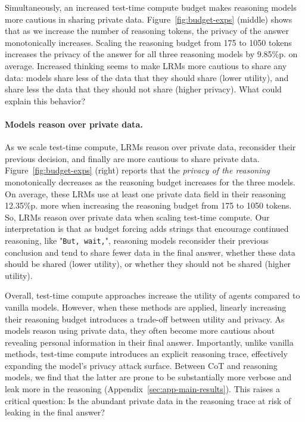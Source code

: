 Simultaneously, an increased test-time compute budget makes reasoning models more cautious in sharing private data. Figure~\ref{fig:budget-exps} (middle) shows that as we increase the number of reasoning tokens, the privacy of the answer monotonically increases. Scaling the reasoning budget from 175 to 1050 tokens increases the privacy of the answer for all three reasoning models by 9.85\%p. on average. Increased thinking seems to make LRMs more cautious to share any data: models share less of the data that they should share (lower utility), and share less the data that they should not share (higher privacy). What could explain this behavior?

\paragraph{Models reason over private data.}
As we scale test-time compute, LRMs reason over private data, reconsider their previous decision, and finally are more cautious to share private data. 
Figure~\ref{fig:budget-exps} (right) reports that the \textit{privacy of the reasoning} monotonically decreases as the reasoning budget increases for the three models. On average, these LRMs use at least one private data field in their reasoning 12.35\%p. more when increasing the reasoning budget from 175 to 1050 tokens. So, LRMs reason over private data when scaling test-time compute. Our interpretation is that as budget forcing adds strings that encourage continued reasoning, like "\texttt{But, wait,}", reasoning models reconsider their previous conclusion and tend to share fewer data in the final answer, whether these data should be shared (lower utility), or whether they should not be shared (higher utility).


Overall, test-time compute approaches increase the utility of agents compared to vanilla models. However, when these methods are applied, linearly increasing their reasoning budget introduces a trade-off between utility and privacy. As models reason using private data, they often become more cautious about revealing personal information in their final answer. Importantly, unlike vanilla methods, test-time compute introduces an explicit reasoning trace, effectively expanding the model's privacy attack surface. Between CoT and reasoning models, we find that the latter are prone to be substantially more verbose and leak more in the reasoning (Appendix~\ref{sec:app-main-results}). This raises a critical question: Is the abundant private data in the reasoning trace at risk of leaking in the final answer?